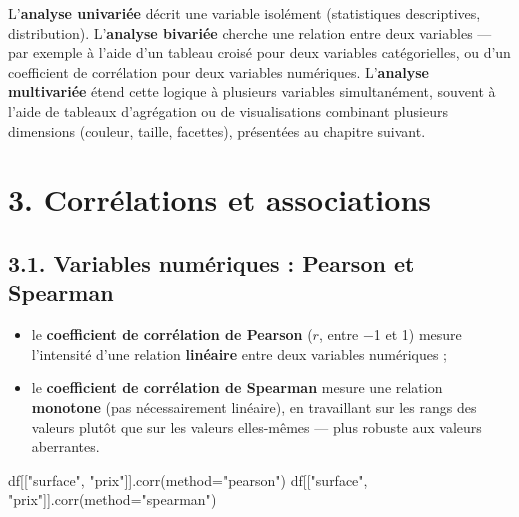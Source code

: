 \documentclass[
  french,
  letterpaper,
  open=any]{scrbook}
\newenvironment{Shaded}{\begin{snugshade}}{\end{snugshade}}
\newcommand{\NormalTok}[1]{\textcolor[rgb]{0.00,0.23,0.31}{#1}}
\newcommand{\OperatorTok}[1]{\textcolor[rgb]{0.37,0.37,0.37}{#1}}
\newcommand{\StringTok}[1]{\textcolor[rgb]{0.13,0.47,0.30}{#1}}
\providecommand{\tightlist}{%
  \setlength{\itemsep}{0pt}\setlength{\parskip}{0pt}}
\theoremstyle{definition}
\theoremstyle{definition}
\theoremstyle{remark}
\begin{document}
L'\textbf{analyse univariée} décrit une variable isolément (statistiques
descriptives, distribution). L'\textbf{analyse bivariée} cherche une
relation entre deux variables --- par exemple à l'aide d'un tableau
croisé pour deux variables catégorielles, ou d'un coefficient de
corrélation pour deux variables numériques. L'\textbf{analyse
multivariée} étend cette logique à plusieurs variables simultanément,
souvent à l'aide de tableaux d'agrégation ou de visualisations combinant
plusieurs dimensions (couleur, taille, facettes), présentées au chapitre
suivant.

\section{3. Corrélations et
associations}\label{corruxe9lations-et-associations}

\subsection{3.1. Variables numériques : Pearson et
Spearman}\label{variables-numuxe9riques-pearson-et-spearman}

\begin{itemize}
\tightlist
\item
  le \textbf{coefficient de corrélation de Pearson} (\(r\), entre −1 et
  1) mesure l'intensité d'une relation \textbf{linéaire} entre deux
  variables numériques ;
\item
  le \textbf{coefficient de corrélation de Spearman} mesure une relation
  \textbf{monotone} (pas nécessairement linéaire), en travaillant sur
  les rangs des valeurs plutôt que sur les valeurs elles-mêmes --- plus
  robuste aux valeurs aberrantes.
\end{itemize}

\begin{Shaded}
\begin{Highlighting}[]
\NormalTok{df[[}\StringTok{"surface"}\NormalTok{, }\StringTok{"prix"}\NormalTok{]].corr(method}\OperatorTok{=}\StringTok{"pearson"}\NormalTok{)}
\NormalTok{df[[}\StringTok{"surface"}\NormalTok{, }\StringTok{"prix"}\NormalTok{]].corr(method}\OperatorTok{=}\StringTok{"spearman"}\NormalTok{)}
\end{Highlighting}
\end{Shaded}
\end{document}
